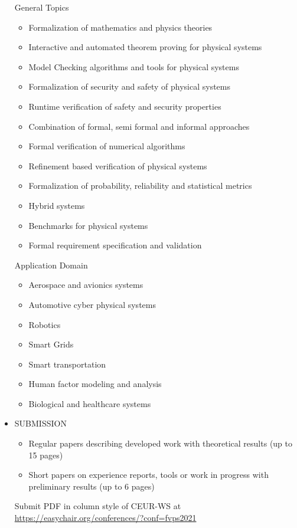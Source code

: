 \documentclass[prodmode,acmtecs]{acmsmall} %
\begin{document}
\begin{itemize}
  General Topics 
 
\begin{itemize}\item  Formalization of mathematics and physics theories
\item  Interactive and automated theorem proving for physical systems
\item  Model Checking algorithms and tools for physical systems
\item  Formalization of security and safety of physical systems
\item  Runtime verification of safety and security properties
\item  Combination of formal, semi formal and informal approaches
\item  Formal verification of numerical algorithms
\item  Refinement based verification of physical systems
\item  Formalization of probability, reliability and statistical metrics
\item  Hybrid systems
\item  Benchmarks for physical systems
\item  Formal requirement specification and validation
\end{itemize} 
 Application Domain 
 
\begin{itemize}\item  Aerospace and avionics systems
\item  Automotive cyber physical systems
\item  Robotics
\item  Smart Grids
\item  Smart transportation
\item  Human factor modeling and analysis
\item  Biological and healthcare systems
\end{itemize} 
\item  SUBMISSION  
 
\begin{itemize}\item  Regular papers describing developed work with theoretical results (up to 15 pages)
\item  Short papers on experience reports, tools or work in progress with preliminary results (up to 6 pages)
\end{itemize} 
  Submit PDF in column style of CEUR-WS at \href{https://easychair.org/conferences/?conf=fvps2021}{https://easychair.org/conferences/?conf=fvps2021} 
 

\end{itemize}
\end{document}

